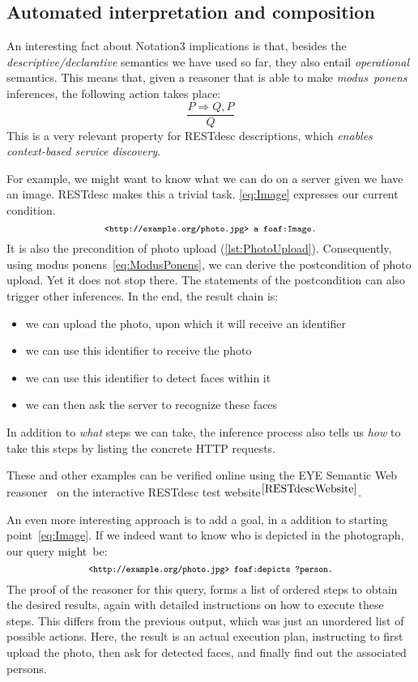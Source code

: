 \documentclass[runningheads,a4paper, twocolumn]{llncs}
\begin{document}
\subsection{Automated interpretation and composition}
\label{Composition}
An interesting fact about Notation3 implications is that, besides the \emph{descriptive/declarative} semantics we have used so far, they also entail \emph{operational} semantics. This means that, given a reasoner that is able to make \emph{modus~ponens} inferences, the following action takes place:
\begin{equation}\label{eq:ModusPonens}
    \frac{P \Rightarrow Q, P}{Q}
\end{equation}
This is a very relevant property for RESTdesc descriptions, which \emph{enables context-based service discovery}.

For example, we might want to know what we can do on a server given we have an image. RESTdesc makes this a trivial task. \ref{eq:Image} expresses our current condition.
\begin{equation}\label{eq:Image}
    {\fontsize{8}{10}\texttt{<http://example.org/photo.jpg> a foaf:Image.}}
\end{equation}
It is also the precondition of photo upload (\autoref{lst:PhotoUpload}). Consequently, using modus ponens~\ref{eq:ModusPonens}, we can derive the postcondition of photo upload. Yet it does not stop there. The statements of the postcondition can also trigger other inferences. In the end, the result chain is:
\begin{itemize}
\item we can upload the photo, upon which it will receive an identifier
\item we can use this identifier to receive the photo
\item we can use this identifier to detect faces within it
\item we can then ask the server to recognize these faces
\end{itemize}
In addition to \emph{what} steps we can take, the inference process also tells us \emph{how} to take this steps by listing the concrete HTTP requests.

These and other examples can be verified online using the EYE Semantic Web reasoner~\cite{Euler} on the interactive RESTdesc test website$^{\ref{RESTdescWebsite}}$.

An even more interesting approach is to add a goal, in a addition to starting point~\ref{eq:Image}. If we indeed want to know who is depicted in the photograph, our query might~be:
\begin{equation*}\label{eq:Image}
    \fontsize{7.8}{10}\texttt{<http://example.org/photo.jpg> foaf:depicts ?person.}
\end{equation*}
The proof of the reasoner for this query, forms a list of ordered steps to obtain the desired results, again with detailed instructions on how to execute these steps. This differs from the previous output, which was just an unordered list of possible actions. Here, the result is an actual execution plan, instructing to first upload the photo, then ask for detected faces, and finally find out the associated persons.
\end{document}

